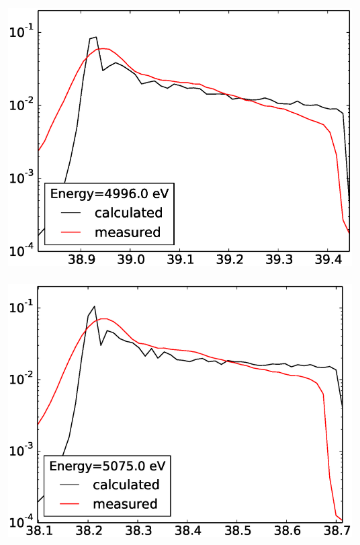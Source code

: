 \documentclass[12pt,oneside,notitlepage,abstracton,a4paper]{scrartcl}
\begin{document}
\begin{figure}[h]
\begin{subfigure}[h]{0.49\textwidth}
  \caption{}
  \label{en2}
 \end{subfigure}\\
 \begin{subfigure}[h]{0.49\textwidth}
  \includegraphics[width=\textwidth]{pics/SrTiO3_4996.eps}
  \caption{}
  \label{en3}
 \end{subfigure}
 \begin{subfigure}[h]{0.49\textwidth}
  \includegraphics[width=\textwidth]{pics/SrTiO3_5075.eps}
  \caption{}
  \label{en4}
 \end{subfigure}
 \caption{}\label{en}
\end{figure}

\clearpage 



\nocite{*}
 
{}
\end{document}
